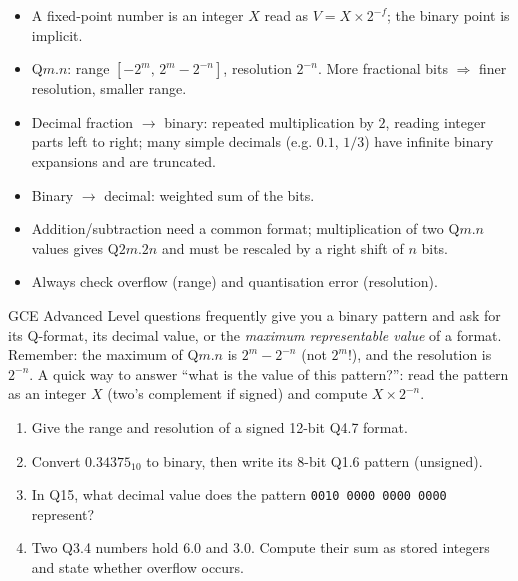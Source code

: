 \documentclass[11pt]{article}
\begin{document}
\begin{aretenir}
\begin{itemize}
\item A fixed-point number is an integer $X$ read as $V=X\times 2^{-f}$; the binary point is implicit.
\item Q$m$.$n$: range $[-2^{m},\,2^{m}-2^{-n}]$, resolution $2^{-n}$. More fractional bits $\Rightarrow$ finer resolution, smaller range.
\item Decimal fraction $\to$ binary: repeated multiplication by $2$, reading integer parts left to right; many simple decimals (e.g. $0.1$, $1/3$) have infinite binary expansions and are truncated.
\item Binary $\to$ decimal: weighted sum of the bits.
\item Addition/subtraction need a common format; multiplication of two Q$m$.$n$ values gives Q$2m$.$2n$ and must be rescaled by a right shift of $n$ bits.
\item Always check overflow (range) and quantisation error (resolution).
\end{itemize}
\end{aretenir}

\begin{savaistu}
GCE Advanced Level questions frequently give you a binary pattern and ask for its Q-format, its decimal value, or the \emph{maximum representable value} of a format. Remember: the maximum of Q$m$.$n$ is $2^{m}-2^{-n}$ (not $2^{m}$!), and the resolution is $2^{-n}$. A quick way to answer ``what is the value of this pattern?'': read the pattern as an integer $X$ (two's complement if signed) and compute $X\times 2^{-n}$.
\end{savaistu}

\begin{exercice}[Practice]
\begin{enumerate}
\item Give the range and resolution of a signed 12-bit Q4.7 format.
\item Convert $0.34375_{10}$ to binary, then write its 8-bit Q1.6 pattern (unsigned).
\item In Q15, what decimal value does the pattern \texttt{0010 0000 0000 0000} represent?
\item Two Q3.4 numbers hold $6.0$ and $3.0$. Compute their sum as stored integers and state whether overflow occurs.
\end{enumerate}
\end{exercice}
\end{document}
